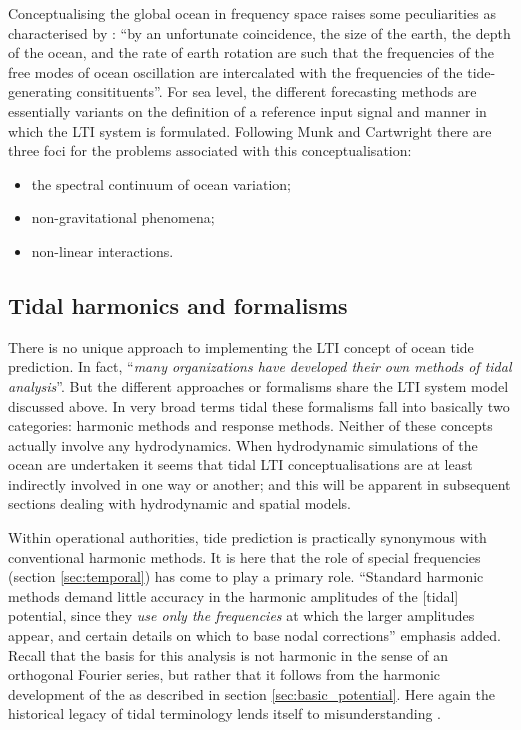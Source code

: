 Conceptualising the global ocean in frequency space raises some peculiarities as characterised by  \citet{Groves:1975ky}: ``by an unfortunate coincidence, the size of the earth, the depth of the ocean, and the rate of earth rotation are such that the frequencies of the free modes of ocean oscillation are intercalated with the frequencies of the tide-generating consitituents''.
For sea level, the different forecasting methods are essentially variants on the  definition of a reference input signal and manner in which the LTI system is formulated.   Following Munk and Cartwright \citep{Munk:1966ts} there are three foci for the problems associated with this conceptualisation:
\begin{itemize}
\item the spectral continuum of ocean variation;
\item non-gravitational phenomena; 
\item non-linear interactions.   
\end{itemize}

\subsection{Tidal harmonics and formalisms}
\label{sec:formalisms}
There is no unique approach to implementing the LTI concept of ocean tide prediction. In fact, ``\textit{many organizations have developed their own methods of tidal analysis}''\citep{IOC:2005tj}. But the different approaches or formalisms share the LTI system model discussed above.  
In very broad terms tidal these formalisms fall into basically two categories: harmonic methods and response methods.  
Neither of these concepts actually involve any hydrodynamics. When hydrodynamic simulations of the ocean are undertaken it seems that tidal LTI conceptualisations are at least indirectly involved in one way or another; and this will be apparent in subsequent sections dealing with hydrodynamic and spatial models. 

Within operational authorities, tide prediction is practically synonymous with conventional harmonic methods. It is here that the role of special frequencies (section \ref{sec:temporal}) has come to play a primary role.
``Standard harmonic methods demand little accuracy in the harmonic amplitudes of the [tidal] potential, since they \textit{use only the frequencies} at which the larger amplitudes appear, and certain details on which to base nodal corrections''\citep{Cartwright:1973em} emphasis added.
Recall that the basis for this analysis is not harmonic in the sense of an orthogonal Fourier series, but rather that it follows from the harmonic development of the \ATGP{} as described in section \ref{sec:basic_potential}.    Here again the historical legacy of tidal terminology lends itself to misunderstanding \citep{Cartwright:2000tt}\citep{Parker:2007wq}.


